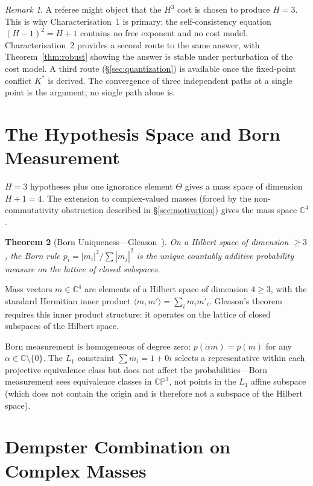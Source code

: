 \documentclass[11pt,a4paper]{article}
\newtheorem{theorem}{Theorem}[section]
\theoremstyle{definition}
\theoremstyle{remark}
\newtheorem{remark}[theorem]{Remark}
\newcommand{\CP}{\mathbb{CP}}
\newcommand{\C}{\mathbb{C}}
\begin{document}
\begin{remark}
A referee might object that the $H^3$ cost is chosen to produce $H=3$. This is why Characterisation~1 is primary: the self-consistency equation $(H-1)^2=H+1$ contains no free exponent and no cost model. Characterisation~2 provides a second route to the same answer, with Theorem~\ref{thm:robust} showing the answer is stable under perturbation of the cost model. A third route (\S\ref{sec:quantization}) is available once the fixed-point conflict $K^*$ is derived. The convergence of three independent paths at a single point is the argument; no single path alone is.
\end{remark}

\section{The Hypothesis Space and Born Measurement}\label{sec:hilbert}

$H=3$ hypotheses plus one ignorance element $\Theta$ gives a mass space of dimension $H+1=4$. The extension to complex-valued masses (forced by the non-commutativity obstruction described in \S\ref{sec:motivation}) gives the mass space $\C^4$.

\begin{theorem}[Born Uniqueness---Gleason~\cite{Gleason1957}]\label{thm:gleason}
On a Hilbert space of dimension $\geq 3$, the Born rule $p_i=|m_i|^2/\sum|m_j|^2$ is the unique countably additive probability measure on the lattice of closed subspaces.
\end{theorem}

Mass vectors $m\in\C^4$ are elements of a Hilbert space of dimension $4\geq 3$, with the standard Hermitian inner product $\langle m,m'\rangle=\sum_i m_i\overline{m'_i}$. Gleason's theorem requires this inner product structure: it operates on the lattice of closed subspaces of the Hilbert space.

Born measurement is homogeneous of degree zero: $p(\alpha m)=p(m)$ for any $\alpha\in\C\setminus\{0\}$. The $L_1$ constraint $\sum m_i=1+0i$ selects a representative within each projective equivalence class but does not affect the probabilities---Born measurement sees equivalence classes in $\CP^3$, not points in the $L_1$ affine subspace (which does not contain the origin and is therefore not a subspace of the Hilbert space).


\section{Dempster Combination on Complex Masses}\label{sec:dempster}
\end{document}
